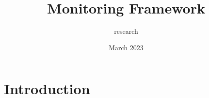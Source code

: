 \documentclass{article}
\title{Monitoring Framework}
\author{research }
\date{March 2023}
\begin{document}
\maketitle

\section{Introduction}
\end{document}
